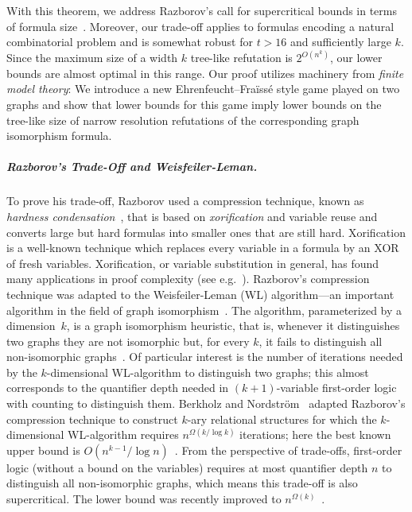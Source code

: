 \documentclass[10pt,a4paper]{article}
\begin{document}
\noindent
%
%
With this theorem, we address
Razborov's call for supercritical bounds in terms of formula size~\cite{DBLP:journals/jacm/Razborov16}. Moreover, our trade-off applies to formulas encoding a natural combinatorial problem and is somewhat robust for $t > 16$ and sufficiently large $k$. Since the maximum size of a width $k$ tree-like refutation is $2^{O(n^k)}$, our lower bounds are almost optimal in this range. Our proof utilizes machinery from \emph{finite model theory}:
%
We introduce a new Ehrenfeucht–Fraïssé style game played on two graphs 
and show that lower bounds for this game imply lower bounds
on the tree-like size of narrow resolution refutations
of the corresponding graph isomorphism formula. %

\subparagraph*{Razborov's Trade-Off and Weisfeiler-Leman.}

To prove his trade-off, Razborov used a compression technique, known as \emph{hardness condensation}~\cite{DBLP:journals/jacm/Razborov16, BerkholzNordstrom16}, that is based on \emph{xorification} and variable reuse
and converts large but hard formulas into smaller ones that are still hard.
Xorification is a well-known technique which replaces every variable in a formula by an XOR of fresh variables.
Xorification, or variable substitution in general, has found many applications in proof complexity 
%
(see e.g.~\cite{DBLP:conf/stoc/Ben-SassonW99,Ben-SassonNordstrom2008, BenSassonNordstrom2011,BeckNT2013}).
Razborov's compression technique was adapted to the Weisfeiler-Leman (WL) algorithm---an
important algorithm in the field of graph isomorphism~\cite{Grohe2012, Babai2016, GroheNeuen2024}.
The algorithm, parameterized by a dimension~$k$, is a graph isomorphism
heuristic, that is, whenever it distinguishes two graphs they are not isomorphic
but, for every $k$, it fails to distinguish all non-isomorphic graphs~\cite{CaiFuererImmerman1992}.
Of particular interest is the number of iterations needed by the $k$-dimensional WL-algorithm to distinguish two graphs; this 
almost corresponds to the quantifier depth needed in $(k+1)$-variable first-order logic with counting to distinguish them.
Berkholz and Nordström~\cite{BerkholzNordstrom16}
adapted Razborov's compression technique
to construct $k$-ary relational structures
for which the $k$-dimensional WL-algorithm requires
$n^{\Omega(k/\log k)}$ iterations; here the best known upper bound is $O(n^{k-1}/\log n)$~\cite{GroheLN23}.
From the perspective of trade-offs, 
first-order logic (without a bound on the variables)
requires at most quantifier depth $n$ to distinguish all non-isomorphic graphs, which means this trade-off is also supercritical.
The lower bound was recently improved to $n^{\Omega(k)}$~\cite{GroheLN23}.
\end{document}
